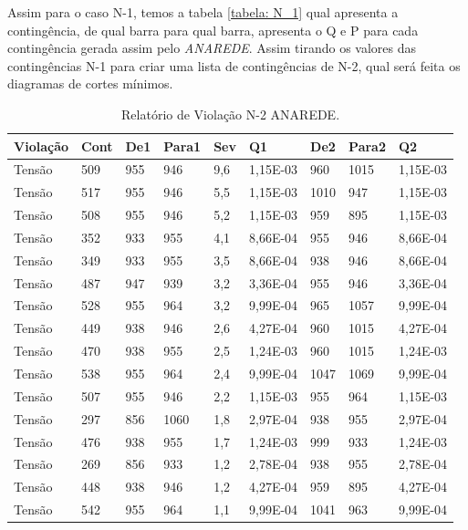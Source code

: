 \documentclass[lettersize,journal]{IEEEtran}
\begin{document}
Assim para o caso N-1, temos a tabela \ref{tabela: N_1} qual apresenta a contingência, de qual barra para qual barra, apresenta o Q e P para cada contingência gerada assim pelo \emph{ANAREDE}. Assim tirando os valores das contingências N-1 para criar uma lista de contingências de N-2, qual será feita os diagramas de cortes mínimos.


\begin{table}[!ht]
	\caption{Relatório de Violação N-2 ANAREDE.}
	\label{tabela: N_2}
	\centering
	\begin{tabularx}{.5\textwidth}{|Y|Y|Y|Y|Y|Y|Y|Y|Y|}
		\hline
		Violação & Cont & De1 & Para1 & Sev & Q1 & De2 & Para2 & Q2 \\ \hline
		Tensão & 509 & 955 & 946 & 9,6 & 1,15E-03 & 960 & 1015 & 1,15E-03 \\ \hline
		Tensão & 517 & 955 & 946 & 5,5 & 1,15E-03 & 1010 & 947 & 1,15E-03 \\ \hline
		Tensão & 508 & 955 & 946 & 5,2 & 1,15E-03 & 959 & 895 & 1,15E-03 \\ \hline
		Tensão & 352 & 933 & 955 & 4,1 & 8,66E-04 & 955 & 946 & 8,66E-04 \\ \hline
		Tensão & 349 & 933 & 955 & 3,5 & 8,66E-04 & 938 & 946 & 8,66E-04 \\ \hline
		Tensão & 487 & 947 & 939 & 3,2 & 3,36E-04 & 955 & 946 & 3,36E-04 \\ \hline
		Tensão & 528 & 955 & 964 & 3,2 & 9,99E-04 & 965 & 1057 & 9,99E-04 \\ \hline
		Tensão & 449 & 938 & 946 & 2,6 & 4,27E-04 & 960 & 1015 & 4,27E-04 \\ \hline
		Tensão & 470 & 938 & 955 & 2,5 & 1,24E-03 & 960 & 1015 & 1,24E-03 \\ \hline
		Tensão & 538 & 955 & 964 & 2,4 & 9,99E-04 & 1047 & 1069 & 9,99E-04 \\ \hline
		Tensão & 507 & 955 & 946 & 2,2 & 1,15E-03 & 955 & 964 & 1,15E-03 \\ \hline
		Tensão & 297 & 856 & 1060 & 1,8 & 2,97E-04 & 938 & 955 & 2,97E-04 \\ \hline
		Tensão & 476 & 938 & 955 & 1,7 & 1,24E-03 & 999 & 933 & 1,24E-03 \\ \hline
		Tensão & 269 & 856 & 933 & 1,2 & 2,78E-04 & 938 & 955 & 2,78E-04 \\ \hline
		Tensão & 448 & 938 & 946 & 1,2 & 4,27E-04 & 959 & 895 & 4,27E-04 \\ \hline
		Tensão & 542 & 955 & 964 & 1,1 & 9,99E-04 & 1041 & 963 & 9,99E-04 \\ \hline

\end{tabularx}
\end{table}
\end{document}
